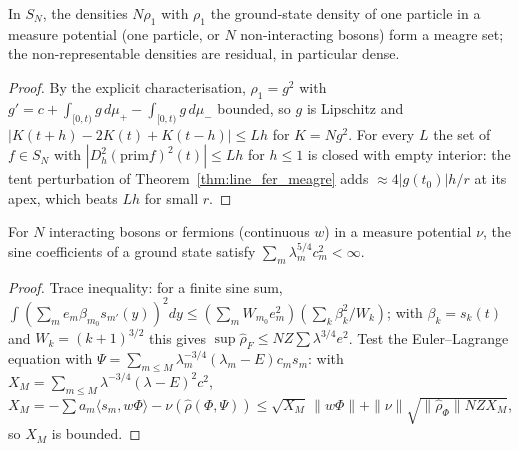 \begin{theorem}
  \label{thm:line_measure_meagre}
  \leanok
  In $S_N$, the densities $N\rho_1$ with $\rho_1$ the ground-state density of one particle in a measure potential
  (one particle, or $N$ non-interacting bosons) form a meagre set; the non-representable densities are residual,
  in particular dense.
\end{theorem}
\begin{proof}
  \leanok
  By the explicit characterisation, $\rho_1=g^2$ with $g'=c+\int_{[0,t)}g\,d\mu_+-\int_{[0,t)}g\,d\mu_-$ bounded, so $g$
  is Lipschitz and $|K(t+h)-2K(t)+K(t-h)|\le Lh$ for $K=N g^2$. For every $L$ the set of $f\in S_N$ with
  $|D^2_h(\mathrm{prim}f)^2(t)|\le Lh$ for $h\le1$ is closed with empty interior: the tent perturbation of
  Theorem~\ref{thm:line_fer_meagre} adds $\approx4|g(t_0)|h/r$ at its apex, which beats $Lh$ for small $r$.
\end{proof}

\begin{theorem}
  \label{thm:line_measure_reg}
  \leanok
  For $N$ interacting bosons or fermions (continuous $w$) in a measure potential $\nu$, the sine coefficients of a ground
  state satisfy $\sum_m\lambda_m^{5/4}c_m^2<\infty$.
\end{theorem}
\begin{proof}
  \leanok
  Trace inequality: for a finite sine sum, $\int(\sum_me_m\beta_{m_0}s_{m'}(y))^2dy\le(\sum_mW_{m_0}e_m^2)(\sum_k\beta_k^2/W_k)$;
  with $\beta_k=s_k(t)$ and $W_k=(k+1)^{3/2}$ this gives $\sup\hat\rho_F\le NZ\sum\lambda^{3/4}e^2$. Test the Euler--Lagrange
  equation with $\Psi=\sum_{m\le M}\lambda_m^{-3/4}(\lambda_m-E)c_ms_m$: with $X_M=\sum_{m\le M}\lambda^{-3/4}(\lambda-E)^2c^2$,
  $X_M=-\sum a_m\langle s_m,w\Phi\rangle-\nu(\hat\rho(\Phi,\Psi))\le\sqrt{X_M}\,\|w\Phi\|+\|\nu\|\sqrt{\|\hat\rho_\Phi\|NZX_M}$,
  so $X_M$ is bounded.
\end{proof}

